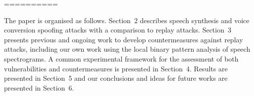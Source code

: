 ==========

The paper is organised as follows.  Section~2 describes speech synthesis and voice conversion spoofing attacks with a comparison to replay attacks. Section~3 presents previous and ongoing work to develop countermeasures against replay attacks, including our own work using the local binary pattern analysis of speech spectrograms.  A common experimental framework for the assessment of both vulnerabilities and countermeasures is presented in Section~4. Results are presented in Section~5 and our conclusions and ideas for future works are presented in Section~6.

